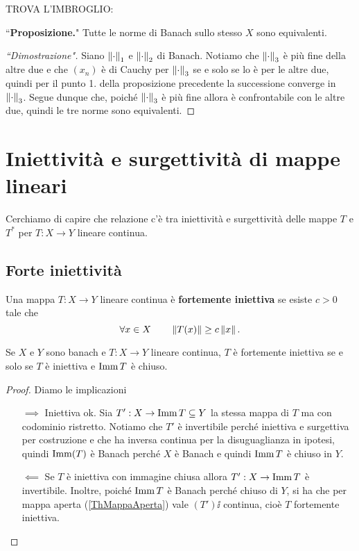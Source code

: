 \begin{exercise}
TROVA L'IMBROGLIO:

\noindent
``\textbf{Proposizione.}" Tutte le norme di Banach sullo stesso $X$ sono equivalenti.
\begin{proof}[``Dimostrazione"]
    Siano $\left\Vert{\cdot}\right\Vert_1$ e $\left\Vert{\cdot}\right\Vert_2$ di Banach. Notiamo che $\left\Vert{\cdot}\right\Vert_3$ \`e pi\`u fine della altre due e che $(x_n)$ \`e di Cauchy per $\left\Vert{\cdot}\right\Vert_3$ se e solo se lo \`e per le altre due, quindi per il punto 1. della proposizione precedente la successione converge in $\left\Vert{\cdot}\right\Vert_3$. Segue dunque che, poich\'e $\left\Vert{\cdot}\right\Vert_3$ \`e pi\`u fine allora \`e confrontabile con le altre due, quindi le tre norme sono equivalenti.
\end{proof}
\end{exercise}



\section{Iniettivit\`a e surgettivit\`a di mappe lineari}

Cerchiamo di capire che relazione c'\`e tra iniettivit\`a e surgettivit\`a delle mappe $T$ e $T^\ast$ per $T:X\to Y$ lineare continua.

\subsection{Forte iniettivit\`a}

\begin{definition}
Una mappa $T:X\to Y$ lineare continua \`e \textbf{fortemente iniettiva} se esiste $c>0$ tale che 
\[\forall x\in X\qquad \left\Vert{T(x)}\right\Vert\geq c\left\Vert{x}\right\Vert.\]
\end{definition}

\begin{proposition}
Se $X$ e $Y$ sono banach e $T:X\to Y$ lineare continua, $T$ \`e fortemente iniettiva se e solo se $T$ \`e iniettiva e $\operatorname{Imm} T$ \`e chiuso.
\end{proposition}
\begin{proof}
Diamo le implicazioni
\setlength{\leftmargini}{0cm}
\begin{itemize}
\item[$\boxed{\implies}$] Iniettiva ok. Sia $T':X\to \operatorname{Imm} T\subseteq Y$ la stessa mappa di $T$ ma con codominio ristretto. Notiamo che $T'$ \`e invertibile perch\'e iniettiva e surgettiva per costruzione e che ha inversa continua per la disuguaglianza in ipotesi, quindi $\operatorname{Imm}(T)$ \`e Banach perch\'e $X$ \`e Banach e quindi $\operatorname{Imm} T$ \`e chiuso in $Y$.
\item[$\boxed{\impliedby}$] Se $T$ \`e iniettiva con immagine chiusa allora $T':X\to \operatorname{Imm} T$ \`e invertibile. Inoltre, poich\'e $\operatorname{Imm} T$ \`e Banach perch\'e chiuso di $Y$, si ha che per mappa aperta (\ref{ThMappaAperta}) vale $(T')\ii$ continua, cio\`e $T$ fortemente iniettiva.
\end{itemize}
\setlength{\leftmargini}{0.5cm}
\end{proof}

